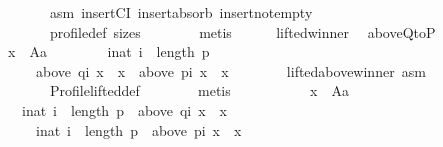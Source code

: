 \begin{isabellebody}
\ \ \ \ \ \ \ \ \ \ \ \ asm{}\ insertCI\ insert{\isacharunderscore}{\kern0pt}absorb\ insert{\isacharunderscore}{\kern0pt}not{\isacharunderscore}{\kern0pt}empty\isanewline
\ \ \ \ \ \ \ \ \ \ \ \ profile{\isacharunderscore}{\kern0pt}def\ sizes\isanewline
\ \ \ \ \ \ \isamarkupfalse%
\ metis\isanewline
\ \ \ \ \isamarkupfalse%
\ lifted{\isacharunderscore}{\kern0pt}winner\ \isamarkupfalse%
\ above{\isacharunderscore}{\kern0pt}QtoP{\isacharcolon}{\kern0pt}\isanewline
\ \ \ \ \ \ {\isachardoublequoteopen}{\isasymforall}x\ {\isasymin}\ A{\isacharminus}{\kern0pt}{\isacharbraceleft}{\kern0pt}a{\isacharbraceright}{\kern0pt}{\isachardot}{\kern0pt}\isanewline
\ \ \ \ \ \ \ \ {\isasymforall}i{\isacharcolon}{\kern0pt}{\isacharcolon}{\kern0pt}nat{\isachardot}{\kern0pt}\ i\ {\isacharless}{\kern0pt}\ length\ p\ {\isasymlongrightarrow}\isanewline
\ \ \ \ \ \ \ \ \ \ {\isacharparenleft}{\kern0pt}above\ {\isacharparenleft}{\kern0pt}q{\isacharbang}{\kern0pt}i{\isacharparenright}{\kern0pt}\ x\ {\isacharequal}{\kern0pt}\ {\isacharbraceleft}{\kern0pt}x{\isacharbraceright}{\kern0pt}\ {\isasymlongrightarrow}\ above\ {\isacharparenleft}{\kern0pt}p{\isacharbang}{\kern0pt}i{\isacharparenright}{\kern0pt}\ x\ {\isacharequal}{\kern0pt}\ {\isacharbraceleft}{\kern0pt}x{\isacharbraceright}{\kern0pt}{\isacharparenright}{\kern0pt}{\isachardoublequoteclose}\isanewline
\ \ \ \ \ \ \isamarkupfalse%
\ lifted{\isacharunderscore}{\kern0pt}above{\isacharunderscore}{\kern0pt}winner{}\ asm{}\isanewline
\ \ \ \ \ \ \ \ \ \ \ \ Profile{\isachardot}{\kern0pt}lifted{\isacharunderscore}{\kern0pt}def\isanewline
\ \ \ \ \ \ \isamarkupfalse%
\ metis\isanewline
\ \ \ \ \isamarkupfalse%
\isanewline
\ \ \ \ \ \ {\isachardoublequoteopen}{\isasymforall}x\ {\isasymin}\ A{\isacharminus}{\kern0pt}{\isacharbraceleft}{\kern0pt}a{\isacharbraceright}{\kern0pt}{\isachardot}{\kern0pt}\isanewline
\ \ \ \ \ \ \ \ {\isacharbraceleft}{\kern0pt}i{\isacharcolon}{\kern0pt}{\isacharcolon}{\kern0pt}nat{\isachardot}{\kern0pt}\ i\ {\isacharless}{\kern0pt}\ length\ p\ {\isasymand}\ above\ {\isacharparenleft}{\kern0pt}q{\isacharbang}{\kern0pt}i{\isacharparenright}{\kern0pt}\ x\ {\isacharequal}{\kern0pt}\ {\isacharbraceleft}{\kern0pt}x{\isacharbraceright}{\kern0pt}{\isacharbraceright}{\kern0pt}\ {\isasymsubseteq}\isanewline
\ \ \ \ \ \ \ \ \ \ {\isacharbraceleft}{\kern0pt}i{\isacharcolon}{\kern0pt}{\isacharcolon}{\kern0pt}nat{\isachardot}{\kern0pt}\ i\ {\isacharless}{\kern0pt}\ length\ p\ {\isasymand}\ above\ {\isacharparenleft}{\kern0pt}p{\isacharbang}{\kern0pt}i{\isacharparenright}{\kern0pt}\ x\ {\isacharequal}{\kern0pt}\ {\isacharbraceleft}{\kern0pt}x{\isacharbraceright}{\kern0pt}{\isacharbraceright}{\kern0pt}{\isachardoublequoteclose}\isanewline

\end{isabellebody}
